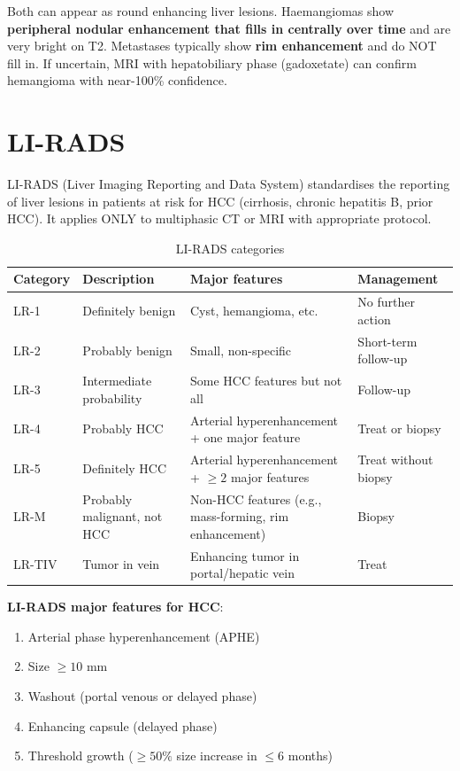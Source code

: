 \begin{pearlbox}
Both can appear as round enhancing liver lesions. Haemangiomas show \textbf{peripheral nodular enhancement that fills in centrally over time} and are very bright on T2. Metastases typically show \textbf{rim enhancement} and do NOT fill in. If uncertain, MRI with hepatobiliary phase (gadoxetate) can confirm hemangioma with near-100\% confidence.
\end{pearlbox}


\section{LI-RADS}
LI-RADS (Liver Imaging Reporting and Data System) standardises the reporting of liver lesions in patients at risk for HCC (cirrhosis, chronic hepatitis B, prior HCC). It applies ONLY to multiphasic CT or MRI with appropriate protocol.

\begin{table}[h]
\centering
\caption{LI-RADS categories}
\begin{tabular}{p{2cm} p{3.5cm} p{3cm} p{3cm}}
\hline
\textbf{Category} & \textbf{Description} & \textbf{Major features} & \textbf{Management} \\
\hline
LR-1 & Definitely benign & Cyst, hemangioma, etc. & No further action \\
LR-2 & Probably benign & Small, non-specific & Short-term follow-up \\
LR-3 & Intermediate probability & Some HCC features but not all & Follow-up \\
LR-4 & Probably HCC & Arterial hyperenhancement + one major feature & Treat or biopsy \\
LR-5 & Definitely HCC & Arterial hyperenhancement + $\geq 2$ major features & Treat without biopsy \\
LR-M & Probably malignant, not HCC & Non-HCC features (e.g., mass-forming, rim enhancement) & Biopsy \\
LR-TIV & Tumor in vein & Enhancing tumor in portal/hepatic vein & Treat \\
\hline
\end{tabular}
\end{table}

\textbf{LI-RADS major features for HCC}:
\begin{enumerate}
  \item Arterial phase hyperenhancement (APHE)
  \item Size $\geq 10$ mm
  \item Washout (portal venous or delayed phase)
  \item Enhancing capsule (delayed phase)
  \item Threshold growth ($\geq 50\%$ size increase in $\leq 6$ months)
\end{enumerate}

